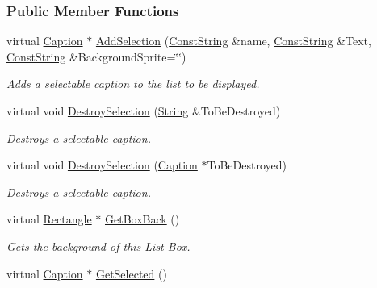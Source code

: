 \subsubsection*{Public Member Functions}
\begin{DoxyCompactItemize}
\item 
virtual \hyperlink{classMezzanine_1_1UI_1_1Caption}{Caption} $\ast$ \hyperlink{classMezzanine_1_1UI_1_1ListBox_aa2133933ef147bb658ddb9e7102cbddd}{AddSelection} (\hyperlink{namespaceMezzanine_a63cd699ac54b73953f35ec9cfc05e506}{ConstString} \&name, \hyperlink{namespaceMezzanine_a63cd699ac54b73953f35ec9cfc05e506}{ConstString} \&Text, \hyperlink{namespaceMezzanine_a63cd699ac54b73953f35ec9cfc05e506}{ConstString} \&BackgroundSprite=\char`\"{}\char`\"{})
\begin{DoxyCompactList}\small\item\em Adds a selectable caption to the list to be displayed. \item\end{DoxyCompactList}\item 
virtual void \hyperlink{classMezzanine_1_1UI_1_1ListBox_a943079b1c090b216fbd29817af42efcf}{DestroySelection} (\hyperlink{namespaceMezzanine_acf9fcc130e6ebf08e3d8491aebcf1c86}{String} \&ToBeDestroyed)
\begin{DoxyCompactList}\small\item\em Destroys a selectable caption. \item\end{DoxyCompactList}\item 
virtual void \hyperlink{classMezzanine_1_1UI_1_1ListBox_a3926e83fb6bbde6205f156ea5c989edf}{DestroySelection} (\hyperlink{classMezzanine_1_1UI_1_1Caption}{Caption} $\ast$ToBeDestroyed)
\begin{DoxyCompactList}\small\item\em Destroys a selectable caption. \item\end{DoxyCompactList}\item 
virtual \hyperlink{classMezzanine_1_1UI_1_1Rectangle}{Rectangle} $\ast$ \hyperlink{classMezzanine_1_1UI_1_1ListBox_ac24fd38d4300b8788b3e42ba2a17c6f7}{GetBoxBack} ()
\begin{DoxyCompactList}\small\item\em Gets the background of this List Box. \item\end{DoxyCompactList}\item 
virtual \hyperlink{classMezzanine_1_1UI_1_1Caption}{Caption} $\ast$ \hyperlink{classMezzanine_1_1UI_1_1ListBox_ae2b97c85a09fd6d74f659c1dc9cd125c}{GetSelected} ()

\end{DoxyCompactItemize}
